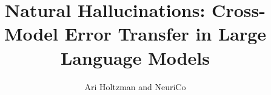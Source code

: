 \documentclass{article}
\title{Natural Hallucinations: Cross-Model Error Transfer in Large Language Models}
\author{
  Ari Holtzman and NeuriCo
}
\begin{document}
\maketitle

\begin{abstract}

\end{abstract}










\end{document}
